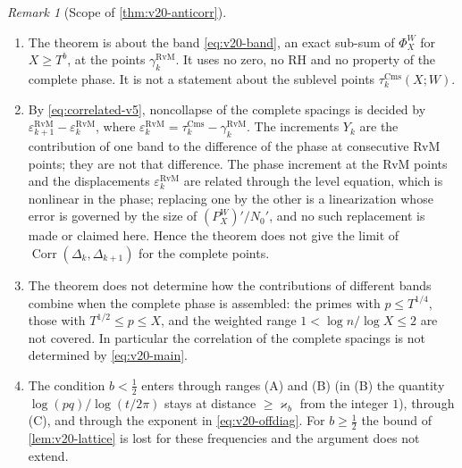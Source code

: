 \documentclass[11pt,a4paper]{article}
\numberwithin{equation}{section}
\theoremstyle{definition}
\theoremstyle{remark}
\newtheorem{remark}[theorem]{Remark}
\newcommand{\Cms}{\mathrm{Cms}}
\begin{document}
\begin{remark}[Scope of \cref{thm:v20-anticorr}]\label{rem:v20-scope}
\begin{enumerate}[label=(\roman*),leftmargin=*]
\item The theorem is about the band \eqref{eq:v20-band}, an exact sub-sum of $\Phi_X^W$ for $X\ge T^b$, at the points $\gamma_k^{\mathrm{RvM}}$. It uses no zero, no RH and no property of the complete phase. It is not a statement about the sublevel points $\tau_k^{\Cms}(X;W)$.
\item By \eqref{eq:correlated-v5}, noncollapse of the complete spacings is decided by $\varepsilon_{k+1}^{\mathrm{RvM}}-\varepsilon_k^{\mathrm{RvM}}$, where $\varepsilon_k^{\mathrm{RvM}}=\tau_k^{\Cms}-\gamma_k^{\mathrm{RvM}}$. The increments $Y_k$ are the contribution of one band to the difference of the phase at consecutive RvM points; they are not that difference. The phase increment at the RvM points and the displacements $\varepsilon_k^{\mathrm{RvM}}$ are related through the level equation, which is nonlinear in the phase; replacing one by the other is a linearization whose error is governed by the size of $(P_X^W)'/N_0'$, and no such replacement is made or claimed here. Hence the theorem does not give the limit of $\operatorname{Corr}(\Delta_k,\Delta_{k+1})$ for the complete points.
\item The theorem does not determine how the contributions of different bands combine when the complete phase is assembled: the primes with $p\le T^{1/4}$, those with $T^{1/2}\le p\le X$, and the weighted range $1<\log n/\log X\le2$ are not covered. In particular the correlation of the complete spacings is not determined by \eqref{eq:v20-main}.
\item The condition $b<\frac12$ enters through ranges (A) and (B) (in (B) the quantity $\log(pq)/\log(t/2\pi)$ stays at distance $\ge\varkappa_b$ from the integer $1$), through (C), and through the exponent in \eqref{eq:v20-offdiag}. For $b\ge\frac12$ the bound of \cref{lem:v20-lattice} is lost for these frequencies and the argument does not extend.
\end{enumerate}
\end{remark}
\end{document}
